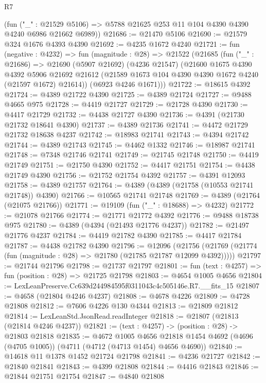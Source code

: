 \begin{lexlean}{R7}
\begin{coremodule}
      (fun ("_" : @21529 @5106) => @5788 @21625 @253 @11 @104 @4390 @4390 @4240 @6986 @21662 @6989))
@21686 := @21470 @5106
@21690 := @21579 @324 @1676 @4393 @4390
@21692 := @4235 @1672 @4240
@21721 := fun (negative : @4232) =>
  fun (magnitude : @28) =>
  @21522
    (@21685
      (fun ("_" : @21686) =>
      @21690
        (@5907 @21692)
        (@4236 @21547)
        (@21600
          @1675
          @4390
          @4392
          @5906
          @21692
          @21612
          (@21589 @1673 @104 @4390 @4390 @1672 @4240 (@21597 @1672) @21614))
        (@6923 @4246 @1671)))
@21722 := @18615 @4392
@21724 := @4389 @21722 @4390
@21725 := @4389 @21724
@21727 := @9488 @4665 @975
@21728 := @4419 @21727
@21729 := @21728 @4390
@21730 := @4417 @21729
@21732 := @4438 @21727 @4390
@21736 := @4391 (@21730 @21732 @18641 @4390)
@21737 := @4389 @21736
@21741 := @4472 @21729 @21732 @18638 @4237
@21742 := @18983 @21741
@21743 := @4394 @21742
@21744 := @4389 @21743
@21745 := @4462 @1332
@21746 := @18987 @21741
@21748 := @7348 @21746 @21741
@21749 := @21745 @21748
@21750 := @4419 @21749
@21751 := @21750 @4390
@21752 := @4417 @21751
@21754 := @4438 @21749 @4390
@21756 := @21752 @21754 @4392
@21757 := @4391 @12093
@21758 := @4389 @21757
@21764 := @4389 (@4389 (@21758 (@10553 @21741 @21748)) @4390)
@21766 := @10565 @21741 @21748
@21769 := @4389 (@21764 (@21075 @21766))
@21771 := @19109 (fun ("_" : @18688) => @4232)
@21772 := @21078 @21766
@21774 := @21771 @21772 @4392
@21776 := @9488 @18738 @975
@21780 := @4389 (@4394 (@21493 @21776 @4237))
@21782 := @21497 @21776 @4237
@21784 := @4419 @21782 @4390
@21785 := @4417 @21784
@21787 := @4438 @21782 @4390
@21796 := @12096
    (@21756 (@21769 (@21774 (fun (magnitude : @28) => @21780 (@21785 @21787 @12099 @4392)))))
@21797 := @21744 @21796
@21798 := @21737 @21797
@21801 := fun (text : @4257) => fun (position : @28) => @21725 @21798
@21803 := @4654 @1005 @4656
@21804 := LexLeanPreserve.Cc639d244984595f0311043c4c505146e.R7.__fits_15
@21807 := @4658 (@21804 @4246 @4237)
@21808 := @4678 @4226
@21809 := @4728 @21808
@21812 := @7606 @4226 @130 @4344
@21813 := @21809 @21812
@21814 := LexLeanStd.JsonRead.readInteger
@21818 := @21807 (@21813 (@21814 @4246 @4237))
@21821 := (text : @4257) -> (position : @28) -> @21803 @21818
@21835 := @4672
    @1005
    @4656
    @21818
    @1454
    @4692
    (@4696 (@4705 @1005))
    (@4711 (@4712 (@4713 @1454) @4656 @4690))
@21840 := @14618 @11 @1378 @1452 @21724 @21798
@21841 := @4236 @21727
@21842 := @21840 @21841
@21843 := @4399 @21808
@21844 := @4416 @21843
@21846 := @21844 @21751 @21754
@21847 := @4840 @21808

\end{coremodule}
\end{lexlean}

